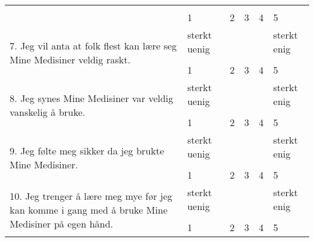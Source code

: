 \begin{longtable}{  p{7cm} p{0.7cm} p{0.7cm} p{0.7cm} p{0.7cm} p{0.7cm}}
     & \multicolumn{1}{|c}{} & \multicolumn{1}{|c}{} & \multicolumn{1}{|c}{} & \multicolumn{1}{|c}{} & \multicolumn{1}{|c|}{} \\ \cline{2-6}
     & 1 & 2 & 3 & 4 & 5 \\ 
    \multirow{3}{6cm}{7. Jeg vil anta at folk flest kan lære seg Mine Medisiner veldig raskt.} & sterkt uenig & & & & sterkt enig \\ \cline{2-6}
     & \multicolumn{1}{|c}{} & \multicolumn{1}{|c}{} & \multicolumn{1}{|c}{} & \multicolumn{1}{|c}{} & \multicolumn{1}{|c|}{} \\ \cline{2-6}
     & 1 & 2 & 3 & 4 & 5 \\ 
    \multirow{3}{6cm}{8. Jeg synes Mine Medisiner var veldig vanskelig å bruke.} & sterkt uenig & & & & sterkt enig \\ \cline{2-6}
     & \multicolumn{1}{|c}{} & \multicolumn{1}{|c}{} & \multicolumn{1}{|c}{} & \multicolumn{1}{|c}{} & \multicolumn{1}{|c|}{} \\ \cline{2-6}
     & 1 & 2 & 3 & 4 & 5 \\ 
    \multirow{3}{6cm}{9. Jeg følte meg sikker da jeg brukte Mine Medisiner. } & sterkt uenig & & & & sterkt enig \\ \cline{2-6}
     & \multicolumn{1}{|c}{} & \multicolumn{1}{|c}{} & \multicolumn{1}{|c}{} & \multicolumn{1}{|c}{} & \multicolumn{1}{|c|}{} \\ \cline{2-6}
     & 1 & 2 & 3 & 4 & 5 \\ 
    \multirow{3}{6cm}{10. Jeg trenger å lære meg mye før jeg kan komme i gang med å bruke Mine Medisiner på egen hånd.} & sterkt uenig & & & & sterkt enig \\ \cline{2-6}
     & \multicolumn{1}{|c}{} & \multicolumn{1}{|c}{} & \multicolumn{1}{|c}{} & \multicolumn{1}{|c}{} & \multicolumn{1}{|c|}{} \\ \cline{2-6}
     & 1 & 2 & 3 & 4 & 5 \\ 
\end{longtable}
